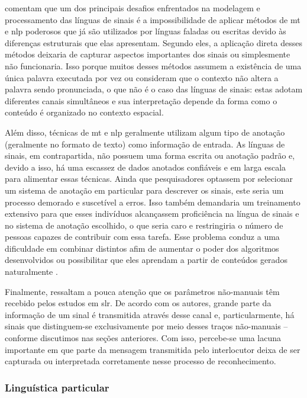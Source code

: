  comentam que um dos principais desafios enfrentados na modelagem e processamento das línguas de sinais é a impossibilidade de aplicar métodos de \acrshort{mt} e \acrshort{nlp} poderosos que já são utilizados por línguas faladas ou escritas devido às diferenças estruturais que elas apresentam. Segundo eles, a aplicação direta desses métodos deixaria de capturar aspectos importantes dos sinais ou simplesmente não funcionaria. Isso porque muitos desses métodos assumem a existência de uma única palavra executada por vez ou consideram que o contexto não altera a palavra sendo pronunciada, o que não é o caso das línguas de sinais: estas adotam diferentes canais simultâneos e sua interpretação depende da forma como o conteúdo é organizado no contexto espacial. 

Além disso, técnicas de \acrshort{mt} e \acrshort{nlp} geralmente utilizam algum tipo de anotação (geralmente no formato de texto) como informação de entrada. As línguas de sinais, em contrapartida, não possuem uma forma escrita ou anotação padrão e, devido a isso, há uma escassez de dados anotados confiáveis e em larga escala para alimentar essas técnicas. 
Ainda que pesquisadores optassem por selecionar um sistema de anotação em particular para descrever os sinais, este seria um processo demorado e suscetível a erros. Isso também demandaria um treinamento extensivo para que esses indivíduos alcançassem proficiência na língua de sinais e no sistema de anotação escolhido, o que seria caro e restringiria o número de pessoas capazes de contribuir com essa tarefa. Esse problema conduz a uma dificuldade em combinar \datasets distintos afim de aumentar o poder dos algoritmos desenvolvidos ou possibilitar que eles aprendam a partir de conteúdos gerados naturalmente \cite{bragg-2019-slr-interdisciplinary}.

Finalmente,  ressaltam a pouca atenção que os parâmetros não-manuais têm recebido pelos estudos em \acrshort{slr}. De acordo com os autores, grande parte da informação de um sinal é transmitida através desse canal e, particularmente, há sinais que distinguem-se exclusivamente por meio desses traços não-manuais -- conforme discutimos nas seções anteriores. Com isso, percebe-se uma lacuna importante em que parte da mensagem transmitida pelo interlocutor deixa de ser capturada ou interpretada corretamente nesse processo de reconhecimento.



\subsubsection{Linguística particular}
\label{sec:slr-desafios-linguistica-particular}

